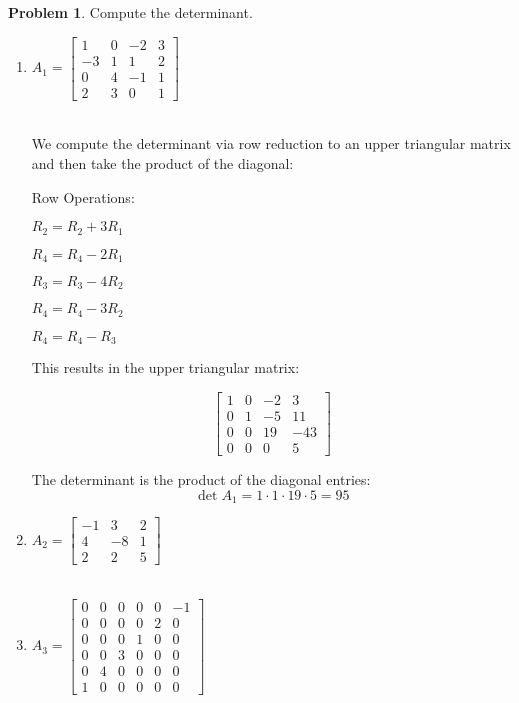 \documentclass[12pt, oneside]{amsart}
\theoremstyle{definition}
\newtheorem{prob}{Problem}
\begin{document}
\begin{prob} Compute the determinant.
\begin{enumerate}
    \item $A_1= \left[\begin{matrix}
        1 & 0 & -2 & 3 \\
        -3 & 1 & 1 & 2 \\
        0 & 4 & -1 & 1 \\
        2 & 3 & 0 & 1
    \end{matrix}\right]$\\\\
    
    \begin{solution}
    We compute the determinant via row reduction to an upper triangular matrix and then take the product of the diagonal:
    
    Row Operations:
    
    $R_2 = R_2 + 3R_1$
    
    $R_4 = R_4 - 2R_1$
    
    $R_3 = R_3 - 4R_2$
    
    $R_4 = R_4 - 3R_2$
    
    $R_4 = R_4 - R_3$

    This results in the upper triangular matrix:
    
    \[
    \begin{bmatrix}
    1 & 0 & -2 & 3 \\
    0 & 1 & -5 & 11 \\
    0 & 0 & 19 & -43 \\
    0 & 0 & 0 & 5
    \end{bmatrix}
    \]
    
    The determinant is the product of the diagonal entries:
    \[
    \det A_1 = 1 \cdot 1 \cdot 19 \cdot 5 = 95
    \]
    \end{solution}
    
    \item $A_2= \left[\begin{matrix}
        -1 & 3 & 2 \\4 & -8 & 1 \\
        2 & 2 & 5
    \end{matrix}\right]$\\\\

    \item $A_3= \left[\begin{matrix}
        0 & 0 & 0 & 0 & 0 & -1 \\
        0 & 0 & 0 & 0 & 2 & 0 \\ 
        0 & 0 & 0 & 1 & 0 & 0 \\
        0 & 0 & 3 & 0 & 0 & 0 \\
        0 & 4 & 0 & 0 & 0 & 0 \\
        1 & 0 & 0 & 0 & 0 & 0 
    \end{matrix}\right]$
    

\end{enumerate}
\end{prob}
\end{document}
